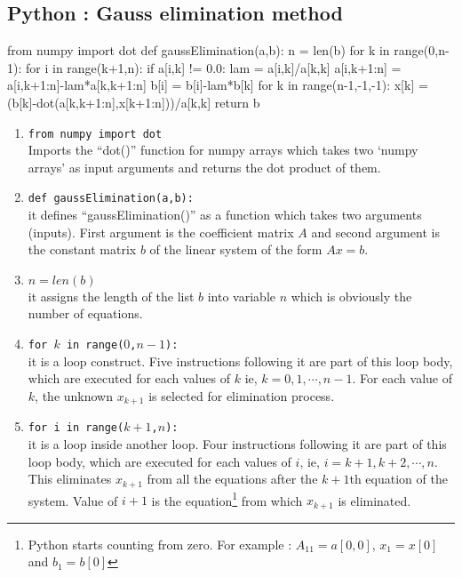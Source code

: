 \subsection{Python : Gauss elimination method}
\begin{program}
	\begin{python}
	from numpy import dot
	def gaussElimination(a,b):
		n = len(b)
		for k in range(0,n-1):
			for i in range(k+1,n):
				if a[i,k] != 0.0:
					lam = a[i,k]/a[k,k]
					a[i,k+1:n] = a[i,k+1:n]-lam*a[k,k+1:n]
					b[i] = b[i]-lam*b[k]
		for k in range(n-1,-1,-1):
			x[k] = (b[k]-dot(a[k,k+1:n],x[k+1:n]))/a[k,k]
		return b
	\end{python}
\end{program}

\begin{commentary}
\begin{enumerate}[label=Line \arabic*]
	\item \texttt{from numpy import dot} \\ Imports the ``dot()'' function for numpy arrays which takes two `numpy arrays' as input arguments and returns the dot product of them.
	\item \texttt{def gaussElimination(a,b):}\\ it defines ``gaussElimination()'' as a function which takes two arguments (inputs).
		First argument is the coefficient matrix $A$ and second argument is the constant matrix $b$ of the linear system of the form $Ax = b$.
	\item \texttt{$n = len(b)$}\\ it assigns the length of the list $b$ into variable $n$ which is obviously the number of equations.
	\item \texttt{for $k$ in range($0$,$n-1$):}  \\ it is a loop construct.
		Five instructions following it are part of this loop body, which are executed for each values of $k$ ie, $k = 0, 1, \cdots, n-1$.
		For each value of $k$, the unknown $x_{k+1}$ is selected for elimination process.
	\item \texttt{for i in range($k+1$,$n$):}\\ it is a loop inside another loop.
		Four instructions following it are part of this loop body, which are executed for each values of $i$, ie, $i = k+1, k+2, \cdots, n$.
		This eliminates $x_{k+1}$ from all the equations after the $k+1$th equation of the system.
		Value of $i+1$ is the equation\footnote{Python starts counting from zero.
		For example : $A_{11} = a[0,0]$, $x_1 = x[0]$ and $b_1 = b[0]$} from which $x_{k+1}$ is eliminated.

\end{enumerate}
\end{commentary}
